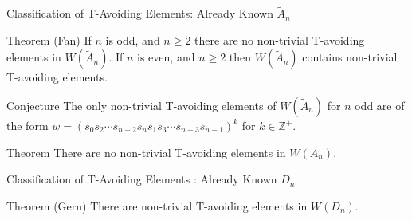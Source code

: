 \documentclass[9pt,handout]{beamer}
\newcommand\heapblock[4]{\fill[fill=#4, fill opacity=0.35, draw=#4, line width=1.1pt, rounded corners,shift={(\xxaxis:#1)},shift={(\yyaxis:#2)}] (-1,-1) rectangle (1,1);\node at (#1,#2) {\footnotesize $#3$};}
\newcommand\xxaxis{0}
\newcommand\yyaxis{90}
\begin{document}


\begin{frame}{Classification of T-Avoiding Elements: Already Known $\widetilde{A}_n$}

\begin{block}{Theorem (Fan)}
	If $n$ is odd, and $n \geq 2$ there are no non-trivial T-avoiding elements in $W(\widetilde{A}_n)$. If $n$ is even, and $n \geq 2$ then $W(\widetilde{A}_n)$ contains non-trivial T-avoiding elements.
\end{block}
\pause
\begin{block}{Conjecture}
The only non-trivial T-avoiding elements of $W(\widetilde{A}_n)$ for $n$ odd are of the form $w=(s_0s_2 \cdots s_{n-2}s_ns_1s_3 \cdots s_{n-3}s_{n-1})^k$  for $k \in \mathbb{Z}^+$.	
\end{block}
\pause
\begin{block}{Theorem}
There are no non-trivial T-avoiding elements in $W(A_n)$.	
\end{block}

\end{frame}




\begin{frame}{Classification of T-Avoiding Elements : Already Known $D_n$}

\begin{block}{Theorem (Gern)}
There are non-trivial T-avoiding elements in $W(D_n)$.	
\end{block}
\pause
\begin{figure}
\end{figure}
	
\end{frame}


\end{document}
